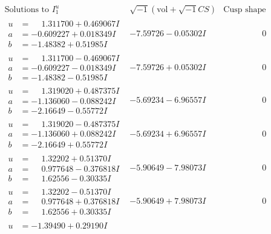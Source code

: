 \documentclass[1p]{elsarticle_modified}
\theoremstyle{definition}
\newcommand{\I}{\sqrt{-1}}
\begin{document}
$$\begin{array}{c|c|c}
\text{Solutions to }I^u_{1}& \I (\text{vol} + \sqrt{-1}CS) & \text{Cusp shape}\\
 \hline 
\begin{aligned}
u &= \phantom{-}1.311700 + 0.469067 I \\
a &= -0.609227 + 0.018349 I \\
b &= -1.48382 + 0.51985 I\end{aligned}
 & -7.59726 - 0.05302 I & \phantom{-0.000000 } 0 \\ \hline\begin{aligned}
u &= \phantom{-}1.311700 - 0.469067 I \\
a &= -0.609227 - 0.018349 I \\
b &= -1.48382 - 0.51985 I\end{aligned}
 & -7.59726 + 0.05302 I & \phantom{-0.000000 } 0 \\ \hline\begin{aligned}
u &= \phantom{-}1.319020 + 0.487375 I \\
a &= -1.136060 - 0.088242 I \\
b &= -2.16649 - 0.55772 I\end{aligned}
 & -5.69234 - 6.96557 I & \phantom{-0.000000 } 0 \\ \hline\begin{aligned}
u &= \phantom{-}1.319020 - 0.487375 I \\
a &= -1.136060 + 0.088242 I \\
b &= -2.16649 + 0.55772 I\end{aligned}
 & -5.69234 + 6.96557 I & \phantom{-0.000000 } 0 \\ \hline\begin{aligned}
u &= \phantom{-}1.32202 + 0.51370 I \\
a &= \phantom{-}0.977648 - 0.376818 I \\
b &= \phantom{-}1.62556 - 0.30335 I\end{aligned}
 & -5.90649 - 7.98073 I & \phantom{-0.000000 } 0 \\ \hline\begin{aligned}
u &= \phantom{-}1.32202 - 0.51370 I \\
a &= \phantom{-}0.977648 + 0.376818 I \\
b &= \phantom{-}1.62556 + 0.30335 I\end{aligned}
 & -5.90649 + 7.98073 I & \phantom{-0.000000 } 0 \\ \hline\begin{aligned}
u &= -1.39490 + 0.29190 I \\

\end{aligned}
\end{array}$$
\end{document}
